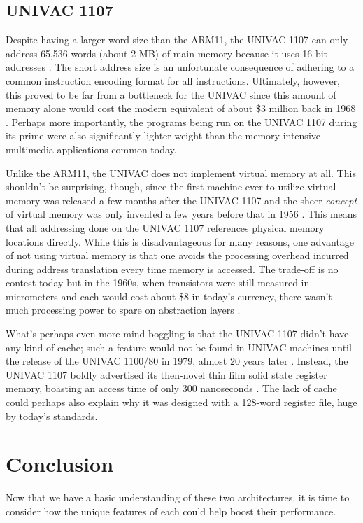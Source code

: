 \documentclass[onecolumn, draftclsnofoot, 10pt, compsoc]{IEEEtran}
\begin{document}
\subsection{UNIVAC 1107}
Despite having a larger word size than the ARM11, the UNIVAC 1107 can only address 65,536 words (about 2 MB) of main memory because it uses 16-bit addresses \cite{univacthinfilm}. The short address size is an unfortunate consequence of adhering to a common instruction encoding format for all instructions. Ultimately, however, this proved to be far from a bottleneck for the UNIVAC since this amount of memory alone would cost the modern equivalent of about \$3 million back in 1968 \cite{univacprice}. Perhaps more importantly, the programs being run on the UNIVAC 1107 during its prime were also significantly lighter-weight than the memory-intensive multimedia applications common today.

Unlike the ARM11, the UNIVAC does not implement virtual memory at all. This shouldn't be surprising, though, since the first machine ever to utilize virtual memory was released a few months after the UNIVAC 1107 and the sheer \textit{concept} of virtual memory was only invented a few years before that in 1956 \cite{virtualmemory}. This means that all addressing done on the UNIVAC 1107 references physical memory locations directly. While this is disadvantageous for many reasons, one advantage of not using virtual memory is that one avoids the processing overhead incurred during address translation every time memory is accessed. The trade-off is no contest today but in the 1960s, when transistors were still measured in micrometers and each would cost about \$8 in today's currency, there wasn't much processing power to spare on abstraction layers \cite{transistorprice}.

What's perhaps even more mind-boggling is that the UNIVAC 1107 didn't have any kind of cache; such a feature would not be found in UNIVAC machines until the release of the UNIVAC 1100/80 in 1979, almost 20 years later \cite{univacwiki}. Instead, the UNIVAC 1107 boldly advertised its then-novel thin film solid state register memory, boasting an access time of only 300 nanoseconds \cite{univacthinfilm}. The lack of cache could perhaps also explain why it was designed with a 128-word register file, huge by today's standards.
\section{Conclusion}
Now that we have a basic understanding of these two architectures, it is time to consider how the unique features of each could help boost their performance. 
\end{document}
